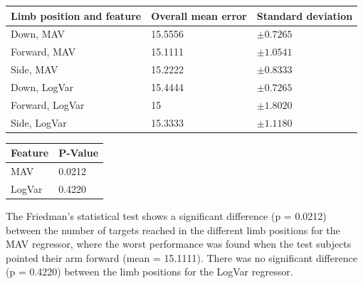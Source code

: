 	\begin{center}
		\begin{tabular}{l l l}
			\toprule
			\textbf{Limb position and feature} & \textbf{Overall mean error} & \textbf{Standard deviation}\\
			\midrule
			Down, MAV & 15.5556 & $\pm 0.7265$ \\
			Forward, MAV & 15.1111 & $\pm 1.0541$ \\
			Side, MAV & 15.2222 & $\pm 0.8333$ \\
			Down, LogVar & 15.4444 & $\pm 0.7265$ \\
			Forward, LogVar & 15 & $\pm 1.8020$ \\
			Side, LogVar & 15.3333 & $\pm 1.1180$ \\
			\bottomrule
		\end{tabular}
	\end{center}

	\begin{center}
		\begin{tabular}{l l}
			\toprule
			\textbf{Feature} & \textbf{P-Value}\\
			\midrule
			MAV & 0.0212 \\
			LogVar & 0.4220 \\
			\bottomrule
		\end{tabular}
	\end{center}
	
The Friedman's statistical test shows a significant difference (p = 0.0212) between the number of targets reached in the different limb positions for the MAV regressor, where the worst performance was found when the test subjects pointed their arm forward (mean = 15.1111). There was no significant difference (p = 0.4220) between the limb positions for the LogVar regressor.


